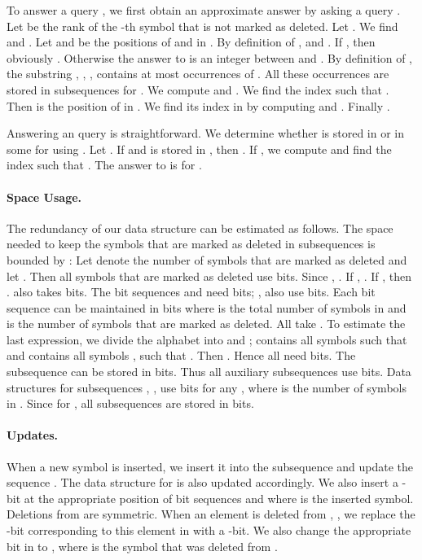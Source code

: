 \documentclass[11pt]{article}\usepackage{fullpage}
\begin{document}
To answer a query , we first obtain an approximate answer by asking a query . 
Let  be the rank of the -th symbol  that is not marked as deleted. Let . We find  and . 
Let  and  be the positions of   and  in .
By definition of ,  and .  If , then obviously .
Otherwise the answer to  is an integer between  and .
By definition of , the substring , , ,  contains at most  occurrences of .
All these occurrences are stored in  subsequences  for  .
We compute  and . We find the index  
such that .
Then  is the position of  in . We find its index in  by computing   and . Finally  .




Answering an  query is straightforward. We determine whether  is stored in  or in some  for  using . Let . If  and  is stored in , then . If , we compute   and find the index  such that 
. The answer to  is  for .


\paragraph{Space Usage.}
The redundancy of our data structure can be estimated as follows. The space needed to keep the symbols that are marked as deleted in subsequences  is bounded by : Let  denote the number of symbols  that are marked as deleted and let . Then all symbols that are marked as deleted use  bits. Since , . If , . If , then  .   also takes  bits.
The bit sequences  and  need  bits; ,  also use  bits. 
 Each bit sequence  can be maintained in  bits where  is the total number of symbols  in  and  is the number of symbols  that are marked as deleted. All  take . To estimate the last expression, we divide the alphabet  into  and ;   contains all symbols  such that  and  contains all symbols , such that . Then . Hence all  need 
 bits.  
The subsequence  can be stored in 
 bits. Thus all auxiliary subsequences use 
 bits. 
Data structures for subsequences , , use   bits for any , 
where  is the number of symbols in .  
Since  for , all subsequences  are stored in  bits. 


\paragraph{Updates.}
When a new symbol is inserted, we insert it into the subsequence  and update the sequence . 
The data structure for  is also updated accordingly. We also insert a -bit at the appropriate position of bit sequences  and  where  is the inserted symbol. Deletions from  are symmetric.  
When an element is deleted from , , we replace the -bit corresponding to this element in   with a -bit. We also  change the appropriate bit in  to , where  is the symbol that was deleted from . 
\end{document}
